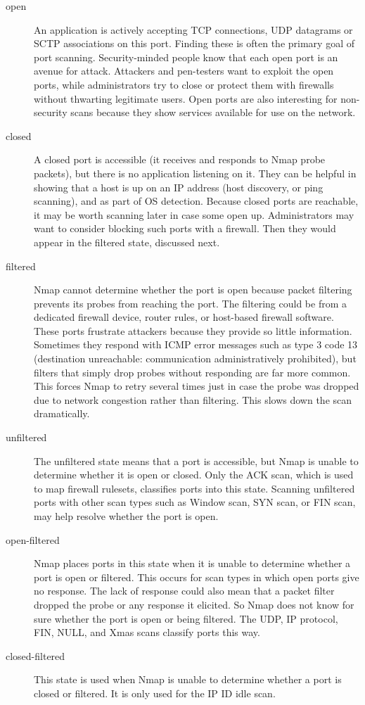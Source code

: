 \documentclass{article}
\begin{document}
\begin{description}
    \item[open]An application is actively accepting TCP connections, UDP datagrams or SCTP associations on this port. Finding these is often the primary goal of port scanning. Security-minded people know that each open port is an avenue for attack. Attackers and pen-testers want to exploit the open ports, while administrators try to close or protect them with firewalls without thwarting legitimate users. Open ports are also interesting for non-security scans because they show services available for use on the network.
    \item[closed]A closed port is accessible (it receives and responds to Nmap probe packets), but there is no application listening on it. They can be helpful in showing that a host is up on an IP address (host discovery, or ping scanning), and as part of OS detection. Because closed ports are reachable, it may be worth scanning later in case some open up. Administrators may want to consider blocking such ports with a firewall. Then they would appear in the filtered state, discussed next.
    \item[filtered]Nmap cannot determine whether the port is open because packet filtering prevents its probes from reaching the port. The filtering could be from a dedicated firewall device, router rules, or host-based firewall software. These ports frustrate attackers because they provide so little information. Sometimes they respond with ICMP error messages such as type 3 code 13 (destination unreachable: communication administratively prohibited), but filters that simply drop probes without responding are far more common. This forces Nmap to retry several times just in case the probe was dropped due to network congestion rather than filtering. This slows down the scan dramatically.
    \item[unfiltered]The unfiltered state means that a port is accessible, but Nmap is unable to determine whether it is open or closed. Only the ACK scan, which is used to map firewall rulesets, classifies ports into this state. Scanning unfiltered ports with other scan types such as Window scan, SYN scan, or FIN scan, may help resolve whether the port is open.
    \item[open-filtered]Nmap places ports in this state when it is unable to determine whether a port is open or filtered. This occurs for scan types in which open ports give no response. The lack of response could also mean that a packet filter dropped the probe or any response it elicited. So Nmap does not know for sure whether the port is open or being filtered. The UDP, IP protocol, FIN, NULL, and Xmas scans classify ports this way.
    \item[closed-filtered]This state is used when Nmap is unable to determine whether a port is closed or filtered. It is only used for the IP ID idle scan.
\end{description}
\end{document}
